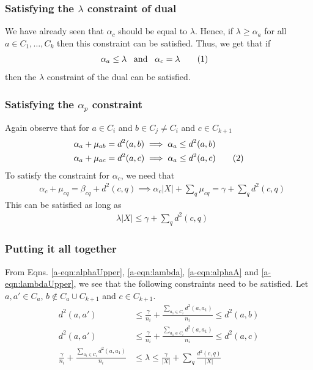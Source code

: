 \documentclass[12pt]{article}
\newcommand\numberthis{\addtocounter{equation}{1}\tag{\theequation}}
\begin{document}
\subsubsection*{Satisfying the $\lambda$ constraint of dual}
We have already seen that $\alpha_c$ should be equal to $\lambda$. Hence, if $\lambda \ge \alpha_a$ for all $a \in C_1, \ldots, C_k$ then this constraint can be satisfied. Thus, we get that if
\begin{align*}
  & \alpha_a \le \lambda \enspace\text{ and }\enspace\alpha_c = \lambda \numberthis\label{a-eqn:lambda}
\end{align*}
then the $\lambda$ constraint of the dual can be satisfied.
\subsubsection*{Satisfying the $\alpha_p$ constraint}
Again observe that for $a \in C_i$ and $b \in C_j \not=C_i$ and $c \in C_{k+1}$
\begin{align*}
  &\alpha_a + \mu_{ab} = d^2(a, b) \implies \alpha_a \le d^2(a, b)\\
  &\alpha_a + \mu_{ac} = d^2(a, c) \implies \alpha_a \le d^2(a, c)\numberthis\label{a-eqn:alphaUpper}
\end{align*}
To satisfy the constraint for $\alpha_c$, we need that 
\begin{align*}
  &\alpha_c + \mu_{cq} = \beta_{cq} + d^2(c, q) \implies \alpha_c |X| + \sum_q\mu_{cq} = \gamma + \sum_q d^2(c, q)
\end{align*}
This can be satisfied as long as 
\begin{align}
  &\lambda |X| \le \gamma + \sum_q d^2(c, q) \label{a-eqn:lambdaUpper}
\end{align}

\subsubsection*{Putting it all together}
From Eqns. \ref{a-eqn:alphaUpper}, \ref{a-eqn:lambda}, \ref{a-eqn:alphaA} and \ref{a-eqn:lambdaUpper}, we see that the following constraints need to be satisfied. Let $a, a' \in C_a$, $b \not\in C_a \cup C_{k+1}$ and $c 
\in C_{k+1}$.
\begin{align}
  d^2(a, a') &\le \frac{\gamma}{n_i} + \frac{\sum_{a_1 \in C_i}d^2(a, a_1)}{n_i} \le d^2(a, b) \label{a-eqn:dab}\\
  d^2(a, a') &\le \frac{\gamma}{n_i} + \frac{\sum_{a_1 \in C_i}d^2(a, a_1)}{n_i} \le d^2(a, c) \label{a-eqn:dac}\\
  \frac{\gamma}{n_i} + \frac{\sum_{a_1 \in C_i}d^2(a, a_1)}{n_i} &\le \lambda \le \frac{\gamma}{|X|} + \sum_q \frac{d^2(c, q)}{|X|} \label{a-eqn:lambdaUL}
\end{align}
\end{document}
